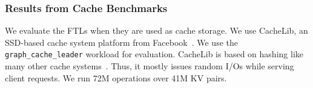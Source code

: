 \subsubsection{Results from Cache Benchmarks}

We evaluate the FTLs when they are used as cache
storage. We use CacheLib, an SSD-based cache system platform from
Facebook~\cite{cachelib}. We use the \texttt{graph\_cache\_leader} workload for evaluation.
CacheLib is based on hashing like many other cache
systems~\cite{bluecache, kangaroo}.  Thus, it mostly issues random I/Os while
serving client requests.  We run 72M operations over 41M KV pairs. 


